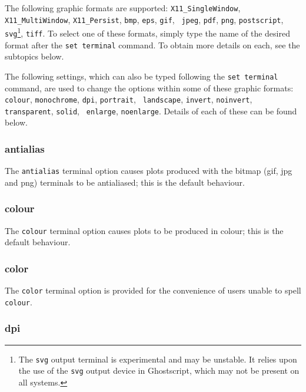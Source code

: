 The following graphic formats are supported:  {\tt X11\_SingleWindow}, {\tt
X11\_MultiWindow}, {\tt X11\_Persist}, {\tt bmp}, {\tt eps}, {\tt gif}, {\tt
jpeg}, {\tt pdf}, {\tt png}, {\tt postscript}, {\tt svg}\footnote{The {\tt svg}
output terminal is experimental and may be unstable. It relies upon the use of
the {\tt svg} output device in Ghostscript, which may not be present on all
systems.}, {\tt tiff}.  To select one of these formats, simply type the name of
the desired format after the {\tt set terminal} command. To obtain more details
on each, see the subtopics below.

The following settings, which can also be typed following the {\tt set
terminal} command, are used to change the options within some of these graphic
formats: {\tt colour}, {\tt monochrome}, {\tt dpi}, {\tt portrait}, {\tt
landscape}, {\tt invert}, {\tt noinvert}, {\tt transparent}, {\tt solid}, {\tt
enlarge}, {\tt noenlarge}. Details of each of these can be found below.


\subsubsection{antialias}

The {\tt antialias} terminal option causes plots produced with the bitmap (gif,
jpg and png) terminals to be antialiased; this is the default behaviour.


\subsubsection{colour}

The {\tt colour} terminal option causes plots to be produced in colour; this is
the default behaviour.


\subsubsection{color}

The {\tt color} terminal option is provided for the convenience of users unable
to spell {\tt colour}.


\subsubsection{dpi}


